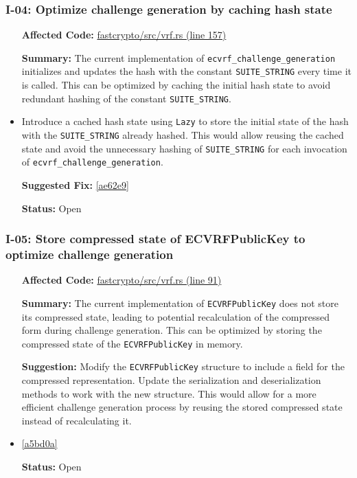 \subsubsection*{I-04: Optimize challenge generation by caching hash state}
\begin{itemize}[align=left]
\item[\textbf{Affected Code:}] \href{https://github.com/MystenLabs/fastcrypto/blob/963205c6d0538fe548b8b10037cf87a53af6f424/fastcrypto/src/vrf.rs#L157}{fastcrypto/src/vrf.rs (line 157)}
\item[\textbf{Summary:}] The current implementation of \lstinline{ecvrf_challenge_generation} initializes and updates the hash with the constant \lstinline{SUITE_STRING} every time it is called. This can be optimized by caching the initial hash state to avoid redundant hashing of the constant \lstinline{SUITE_STRING}.
\item[\textbf{Suggestion:}] Introduce a cached hash state using \lstinline{Lazy} to store the initial state of the hash with the \lstinline{SUITE_STRING} already hashed. This would allow reusing the cached state and avoid the unnecessary hashing of \lstinline{SUITE_STRING} for each invocation of \lstinline{ecvrf_challenge_generation}.
\item[\textbf{Suggested Fix:}] \href{https://github.com/MystenLabs/fastcrypto/pull/543/commits/ae62e9bdb527574974a34413ef540d3f29d38d87}{[ae62e9]}
\item[\textbf{Status:}] Open
\end{itemize}

\subsubsection*{I-05: Store compressed state of ECVRFPublicKey to optimize challenge generation}
\begin{itemize}[align=left]
\item[\textbf{Affected Code:}] \href{https://github.com/MystenLabs/fastcrypto/blob/963205c6d0538fe548b8b10037cf87a53af6f424/fastcrypto/src/vrf.rs#L91}{fastcrypto/src/vrf.rs (line 91)}
\item[\textbf{Summary:}] The current implementation of \lstinline{ECVRFPublicKey} does not store its compressed state, leading to potential recalculation of the compressed form during challenge generation. This can be optimized by storing the compressed state of the \lstinline{ECVRFPublicKey} in memory.
\item[\textbf{Suggestion:}] Modify the \lstinline{ECVRFPublicKey} structure to include a field for the compressed representation. Update the serialization and deserialization methods to work with the new structure. This would allow for a more efficient challenge generation process by reusing the stored compressed state instead of recalculating it.
\item[\textbf{Suggested Fix:}] \href{https://github.com/MystenLabs/fastcrypto/pull/543/commits/a5bd0a335c4120fb05db801895a778905aaffcac}{[a5bd0a]}
\item[\textbf{Status:}] Open
\end{itemize}

